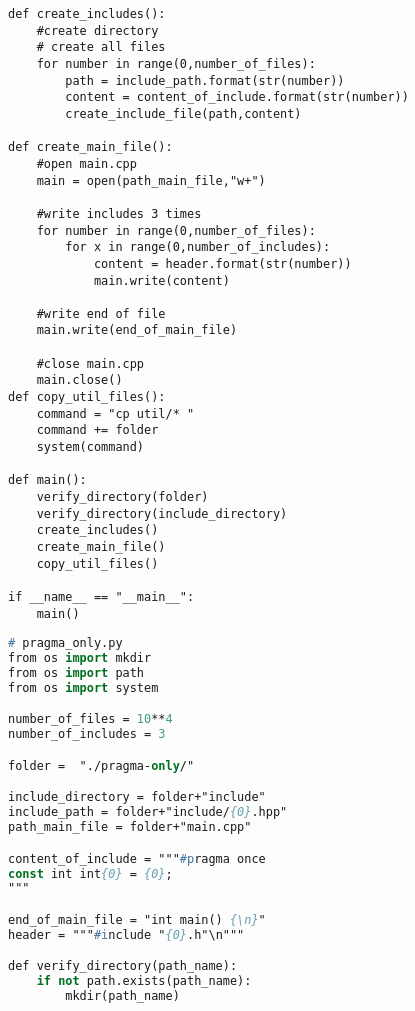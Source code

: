 \begin{apendicesenv}
\begin{lstlisting}
def create_includes():
    #create directory
    # create all files
    for number in range(0,number_of_files):
        path = include_path.format(str(number))
        content = content_of_include.format(str(number))
        create_include_file(path,content)
    
def create_main_file():
    #open main.cpp
    main = open(path_main_file,"w+")

    #write includes 3 times
    for number in range(0,number_of_files):
        for x in range(0,number_of_includes):
            content = header.format(str(number))
            main.write(content)

    #write end of file
    main.write(end_of_main_file)

    #close main.cpp
    main.close()
def copy_util_files():                                                           
    command = "cp util/* "                                                       
    command += folder                                                            
    system(command)                                                              

def main():
    verify_directory(folder)
    verify_directory(include_directory)
    create_includes()
    create_main_file()
    copy_util_files()

if __name__ == "__main__":
    main()
\end{lstlisting}

\begin{lstlisting}[language=Pascal,frame=single,captionpos=b,
                                                caption={
                     Script usando para gerar diretorios com pragma once},
                                                            label=script_pragma_once_include]
# pragma_only.py
from os import mkdir
from os import path
from os import system

number_of_files = 10**4
number_of_includes = 3

folder =  "./pragma-only/"

include_directory = folder+"include"
include_path = folder+"include/{0}.hpp"
path_main_file = folder+"main.cpp"

content_of_include = """#pragma once
const int int{0} = {0};
"""

end_of_main_file = "int main() {\n}"
header = """#include "{0}.h"\n"""

def verify_directory(path_name):
    if not path.exists(path_name):
        mkdir(path_name)


\end{lstlisting}
\end{apendicesenv}

